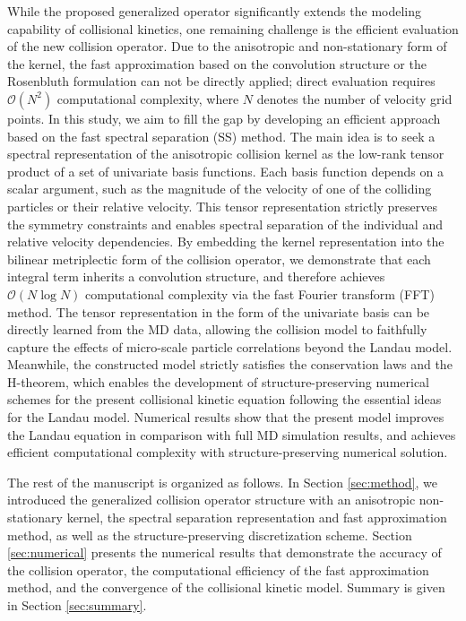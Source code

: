 \documentclass[preprint,1p,times]{elsarticle}
\newcommand{\cO}{\mathcal{O}}
\theoremstyle{definition}
\theoremstyle{remark}
\begin{document}
While the proposed generalized operator significantly extends the modeling capability of collisional kinetics, one remaining challenge is the efficient evaluation of the new collision operator. Due to the anisotropic and non-stationary form of the kernel, the fast approximation based on the convolution structure or the Rosenbluth formulation can not be directly applied; direct evaluation requires $\cO(N^2)$ computational complexity, where $N$ denotes the number of velocity grid points. In this study, we aim to fill the gap by developing an efficient approach based on the fast spectral separation (SS) method. The main idea is to seek a spectral representation of the anisotropic collision kernel as the low-rank tensor product of a set of univariate basis functions. Each basis function depends on a scalar argument, such as the magnitude of the velocity of one of the colliding particles or their relative velocity.
This tensor representation strictly preserves the symmetry constraints and enables spectral separation of the individual and relative velocity dependencies.  By embedding the kernel representation into the bilinear metriplectic form of the collision operator, we demonstrate that each integral term inherits a convolution structure, and therefore achieves $\cO(N\log N)$ computational complexity via the fast Fourier transform (FFT) method. The tensor representation in the form of the univariate basis can be directly learned from the MD data, allowing the collision model to faithfully capture the effects of micro-scale particle correlations beyond the Landau model. Meanwhile, the constructed model strictly satisfies the conservation laws and the H-theorem, which enables the development of structure-preserving numerical schemes for the present collisional kinetic equation following the essential ideas for the Landau model. Numerical results show that the present model improves the Landau equation in comparison with full MD simulation results, and achieves efficient computational complexity with structure-preserving numerical solution. 

The rest of the manuscript is organized as follows.
In Section \ref{sec:method}, we introduced the generalized collision operator structure with an anisotropic non-stationary kernel, the spectral separation representation and fast approximation method, as well as the structure-preserving discretization scheme. 
Section \ref{sec:numerical} presents the numerical results that demonstrate the accuracy of the collision operator, the computational efficiency of the fast approximation method, and the convergence of the collisional kinetic model. Summary is given in Section \ref{sec:summary}.
\end{document}
